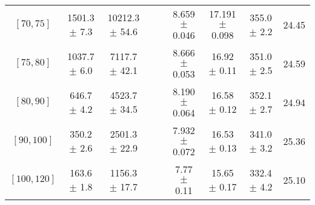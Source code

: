 \begin{tabular}{c||c|c|c|c|c|c|c||c}
$[70, 75]$ & 1501.3 $\pm$ 7.3 & 10212.3 $\pm$ 54.6 &  &  & 8.659 $\pm$ 0.046 & 17.191 $\pm$ 0.098 & 355.0 $\pm$ 2.2 & 24.45\\
$[75, 80]$ & 1037.7 $\pm$ 6.0 & 7117.7 $\pm$ 42.1 &  &  & 8.666 $\pm$ 0.053 & 16.92 $\pm$ 0.11 & 351.0 $\pm$ 2.5 & 24.59\\
$[80, 90]$ & 646.7 $\pm$ 4.2 & 4523.7 $\pm$ 34.5 &  &  & 8.190 $\pm$ 0.064 & 16.58 $\pm$ 0.12 & 352.1 $\pm$ 2.7 & 24.94\\
$[90, 100]$ & 350.2 $\pm$ 2.6 & 2501.3 $\pm$ 22.9 &  &  & 7.932 $\pm$ 0.072 & 16.53 $\pm$ 0.13 & 341.0 $\pm$ 3.2 & 25.36\\
$[100, 120]$ & 163.6 $\pm$ 1.8 & 1156.3 $\pm$ 17.7 &  &  & 7.77 $\pm$ 0.11 & 15.65 $\pm$ 0.17 & 332.4 $\pm$ 4.2 & 25.10\\
\end{tabular}
